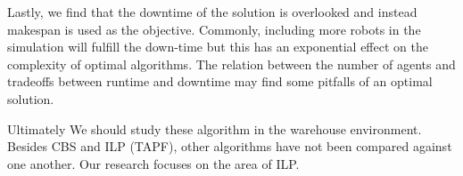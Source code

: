 \documentclass[a4paper,11pt]{article}
\begin{document}
Lastly, we find that the downtime of the solution is overlooked and instead makespan is used as the objective. Commonly, including more robots in the simulation will fulfill the down-time but this has an exponential effect on the complexity of optimal algorithms. The relation between the number of agents and tradeoffs between runtime and downtime may find some pitfalls of an optimal solution. 

Ultimately We should study these algorithm in the warehouse environment. Besides CBS and ILP (TAPF), other algorithms have not been compared against one another. Our research focuses on the area of ILP.




	
\end{document}

